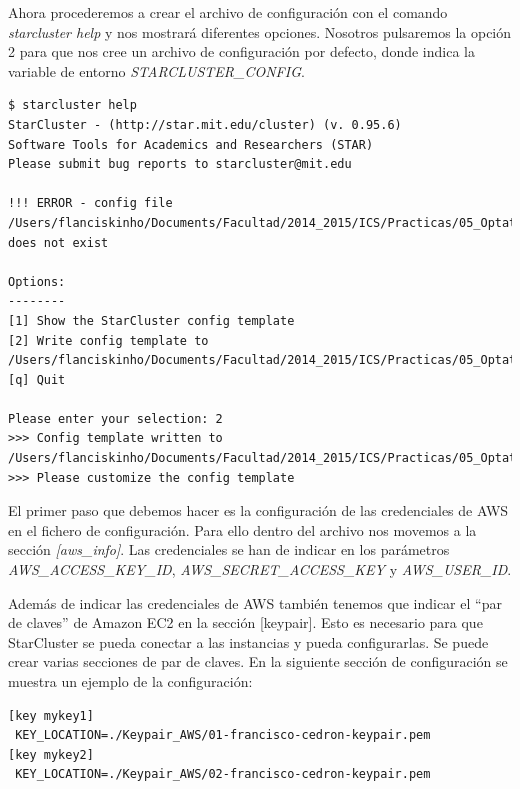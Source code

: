 \documentclass{article}
\begin{document}
Ahora procederemos a crear el archivo de configuración con el comando \emph{starcluster help} y nos mostrará diferentes opciones. Nosotros pulsaremos la opción 2 para que nos cree un archivo de configuración por defecto, donde indica la variable de entorno \emph{STARCLUSTER\_CONFIG}.
\begin{lstlisting}[style=minibash]
$ starcluster help
StarCluster - (http://star.mit.edu/cluster) (v. 0.95.6)
Software Tools for Academics and Researchers (STAR)
Please submit bug reports to starcluster@mit.edu

!!! ERROR - config file /Users/flanciskinho/Documents/Facultad/2014_2015/ICS/Practicas/05_Optativa/starclusterconfig does not exist

Options:
--------
[1] Show the StarCluster config template
[2] Write config template to /Users/flanciskinho/Documents/Facultad/2014_2015/ICS/Practicas/05_Optativa/starclusterconfig
[q] Quit

Please enter your selection: 2
>>> Config template written to /Users/flanciskinho/Documents/Facultad/2014_2015/ICS/Practicas/05_Optativa/starclusterconfig
>>> Please customize the config template
\end{lstlisting} 

	El primer paso que debemos hacer es la configuración de las credenciales de AWS en el fichero de configuración. Para ello dentro del archivo nos movemos a la sección \emph{[aws\_info]}. Las credenciales se han de indicar en los parámetros \emph{AWS\_ACCESS\_KEY\_ID}, \emph{AWS\_SECRET\_ACCESS\_KEY} y \emph{AWS\_USER\_ID}.
	
	Además de indicar las credenciales de AWS también tenemos que indicar el ``par de claves'' de Amazon EC2 en la sección [keypair]. Esto es necesario para que StarCluster se pueda conectar a las instancias y pueda configurarlas. Se puede crear varias secciones de par de claves. En la siguiente sección de configuración se muestra un ejemplo de la configuración:
\begin{lstlisting}
[key mykey1]
 KEY_LOCATION=./Keypair_AWS/01-francisco-cedron-keypair.pem
[key mykey2]
 KEY_LOCATION=./Keypair_AWS/02-francisco-cedron-keypair.pem
\end{lstlisting}
\end{document}
